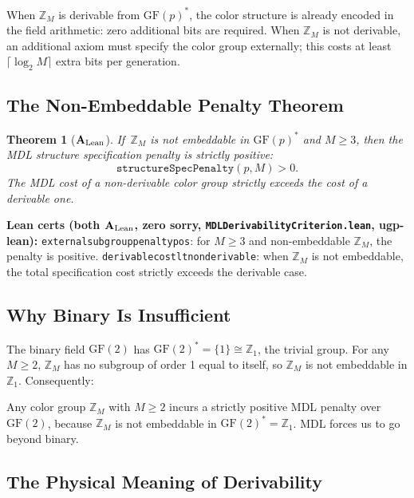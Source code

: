 \documentclass[11pt,openany]{book}
\newtheorem{theorem}{Theorem}[chapter]
\theoremstyle{remark}
\newcommand{\lean}[1]{%
  \penalty-100
  \begingroup\def\_{\textunderscore\allowbreak}\texttt{#1}\endgroup}
\newcommand{\CatAL}{\ensuremath{\textbf{A}_{\rm Lean}}}
\begin{document}
When $\mathbb{Z}_M$ is derivable from $\mathrm{GF}(p)^*$, the color structure is
already encoded in the field arithmetic: zero additional bits are required. When
$\mathbb{Z}_M$ is not derivable, an additional axiom must specify the color group
externally; this costs at least $\lceil\log_2 M\rceil$ extra bits per generation.

\subsection*{The Non-Embeddable Penalty Theorem}

\begin{theorem}[\CatAL]
If\, $\mathbb{Z}_M$ is not embeddable in $\mathrm{GF}(p)^*$ and $M \geq 3$, then the
MDL structure specification penalty is strictly positive:
\[
\mathtt{structureSpecPenalty}(p, M) > 0.
\]
The MDL cost of a non-derivable color group strictly exceeds the cost of a derivable one.
\end{theorem}

\textbf{Lean certs (both \CatAL, zero sorry, \texttt{MDLDerivabilityCriterion.lean}, ugp-lean):}
\lean{external\_subgroup\_penalty\_pos}: for $M \geq 3$ and non-embeddable $\mathbb{Z}_M$,
the penalty is positive.
\lean{derivable\_cost\_lt\_non\_derivable}: when $\mathbb{Z}_M$ is not embeddable,
the total specification cost strictly exceeds the derivable case.

\subsection*{Why Binary Is Insufficient}

The binary field $\mathrm{GF}(2)$ has $\mathrm{GF}(2)^* = \{1\} \cong \mathbb{Z}_1$,
the trivial group. For any $M \geq 2$, $\mathbb{Z}_M$ has no subgroup of order 1 equal
to itself, so $\mathbb{Z}_M$ is not embeddable in $\mathbb{Z}_1$. Consequently:

\begin{tcolorbox}[colback=orange!5,colframe=orange!60,
  title={Result: Binary Insufficiency (\CatAL)}]
Any color group $\mathbb{Z}_M$ with $M \geq 2$ incurs a strictly positive MDL penalty
over $\mathrm{GF}(2)$, because $\mathbb{Z}_M$ is not embeddable in
$\mathrm{GF}(2)^* = \mathbb{Z}_1$. MDL forces us to go beyond binary.
\end{tcolorbox}

\subsection*{The Physical Meaning of Derivability}
\end{document}
